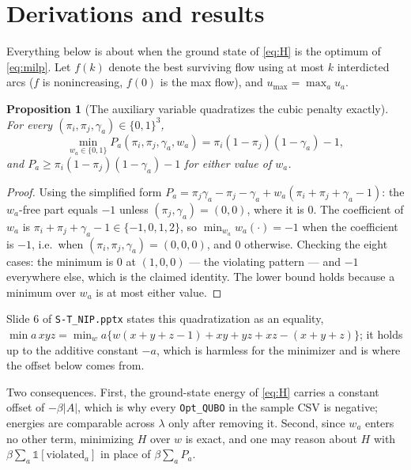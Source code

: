 \documentclass[11pt]{article}
\newcommand{\code}[1]{\texttt{#1}}
\newtheorem{proposition}{Proposition}
\begin{document}
\section{Derivations and results}
\label{sec:derivations}

Everything below is about when the ground state of \eqref{eq:H} is the optimum of \eqref{eq:milp}. Let $f(k)$ denote the best surviving flow using at most $k$ interdicted arcs ($f$ is nonincreasing, $f(0)$ is the max flow), and $u_{\max} = \max_a u_a$.

\begin{proposition}[The auxiliary variable quadratizes the cubic penalty exactly]
\label{prop:quad}
For every $(\pi_i,\pi_j,\gamma_a) \in \{0,1\}^3$,
\[
\min_{w_a \in \{0,1\}} P_a(\pi_i,\pi_j,\gamma_a,w_a) = \pi_i(1-\pi_j)(1-\gamma_a) - 1 ,
\]
and $P_a \ge \pi_i(1-\pi_j)(1-\gamma_a) - 1$ for either value of $w_a$.
\end{proposition}
\begin{proof}
Using the simplified form $P_a = \pi_j\gamma_a - \pi_j - \gamma_a + w_a(\pi_i+\pi_j+\gamma_a-1)$: the $w_a$-free part equals $-1$ unless $(\pi_j,\gamma_a)=(0,0)$, where it is $0$. The coefficient of $w_a$ is $\pi_i+\pi_j+\gamma_a-1 \in \{-1,0,1,2\}$, so $\min_{w_a} w_a(\cdot) = -1$ when the coefficient is $-1$, i.e.\ when $(\pi_i,\pi_j,\gamma_a)=(0,0,0)$, and $0$ otherwise. Checking the eight cases: the minimum is $0$ at $(1,0,0)$ --- the violating pattern --- and $-1$ everywhere else, which is the claimed identity. The lower bound holds because a minimum over $w_a$ is at most either value.
\end{proof}

Slide 6 of \code{S-T\_NIP.pptx} states this quadratization as an equality, $\min a\,xyz = \min_w a\{w(x+y+z-1) + xy+yz+xz-(x+y+z)\}$; it holds up to the additive constant $-a$, which is harmless for the minimizer and is where the offset below comes from.

Two consequences. First, the ground-state energy of \eqref{eq:H} carries a constant offset of $-\beta|A|$, which is why every \code{Opt\_QUBO} in the sample CSV is negative; energies are comparable across $\lambda$ only after removing it. Second, since $w_a$ enters no other term, minimizing $H$ over $w$ is exact, and one may reason about $H$ with $\beta\sum_a \mathbb{1}[\text{violated}_a]$ in place of $\beta \sum_a P_a$.
\end{document}
